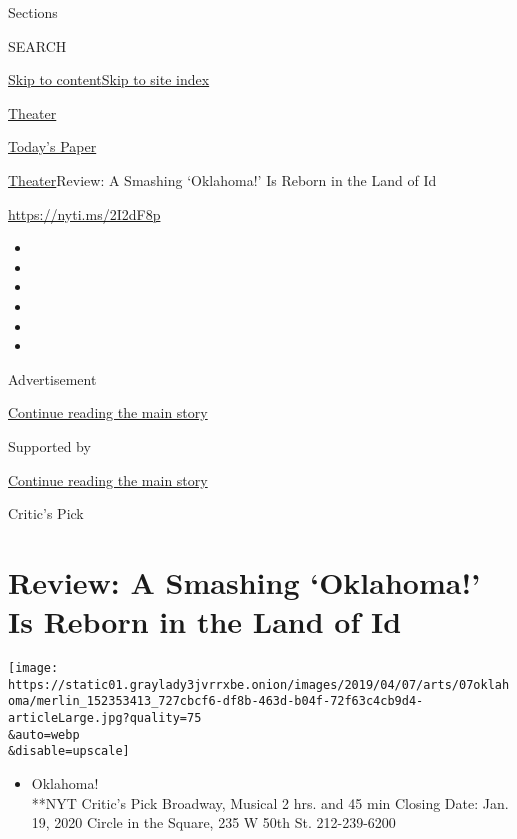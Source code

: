 Sections

SEARCH

\protect\hyperlink{site-content}{Skip to
content}\protect\hyperlink{site-index}{Skip to site index}

\href{https://www.nytimes3xbfgragh.onion/section/theater}{Theater}

\href{https://myaccount.nytimes3xbfgragh.onion/auth/login?response_type=cookie\&client_id=vi}{}

\href{https://www.nytimes3xbfgragh.onion/section/todayspaper}{Today's
Paper}

\href{/section/theater}{Theater}\textbar{}Review: A Smashing `Oklahoma!'
Is Reborn in the Land of Id

\url{https://nyti.ms/2I2dF8p}

\begin{itemize}
\item
\item
\item
\item
\item
\item
\end{itemize}

Advertisement

\protect\hyperlink{after-top}{Continue reading the main story}

Supported by

\protect\hyperlink{after-sponsor}{Continue reading the main story}

Critic's Pick

\hypertarget{review-a-smashing-oklahoma-is-reborn-in-the-land-of-id}{%
\section{Review: A Smashing `Oklahoma!' Is Reborn in the Land of
Id}\label{review-a-smashing-oklahoma-is-reborn-in-the-land-of-id}}

\texttt{[image: https://static01.graylady3jvrrxbe.onion/images/2019/04/07/arts/07oklahoma/merlin\_152353413\_727cbcf6-df8b-463d-b04f-72f63c4cb9d4-articleLarge.jpg?quality=75\\\&auto=webp\\\&disable=upscale]}

\begin{itemize}
\tightlist
\item
  Oklahoma!\\
  **NYT Critic's Pick Broadway, Musical 2 hrs. and 45 min Closing Date:
  Jan. 19, 2020 Circle in the Square, 235 W 50th St. 212-239-6200
\end{itemize}

